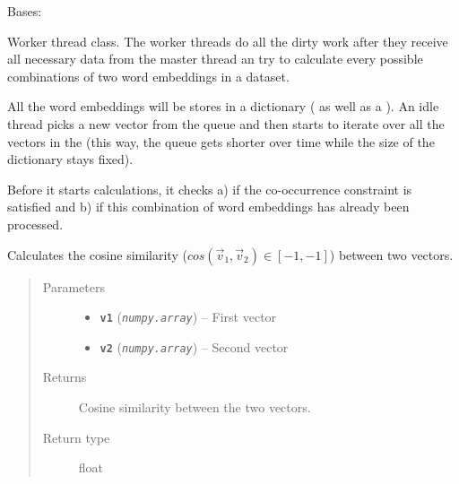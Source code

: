\documentclass[letterpaper,10pt,english]{sphinxmanual}
\begin{document}
\begin{fulllineitems}
\label{src.mapping:src.mapping.mapthreading.MappingWorkerThread}
Bases: 

Worker thread class. The worker threads do all the dirty work after they receive all necessary data from the master
thread an try to calculate every possible combinations of two word embeddings in a dataset.

All the word embeddings will be stores in a dictionary ({\hyperref[src.mapping:src.mapping.mapthreading.VectorDict]{}} as well as a ).
An idle thread picks a new vector from the queue and then starts to iterate over all the vectors in the
{\hyperref[src.mapping:src.mapping.mapthreading.VectorDict]{}} (this way, the queue gets shorter over time while the size of the dictionary stays fixed).

Before it starts calculations, it checks a) if the co-occurrence constraint is satisfied and b) if this combination
of word embeddings has already been processed.

\begin{fulllineitems}
\label{src.mapping:src.mapping.mapthreading.MappingWorkerThread.cosine_similarity}
Calculates the cosine similarity (\(cos(\vec{v}_1, \vec{v}_2) \in [-1,-1]\)) between two vectors.
\begin{quote}\begin{description}
\item[{Parameters}] \leavevmode\begin{itemize}
\item {} 
\textbf{\texttt{v1}} (\emph{\texttt{numpy.array}}) -- First vector

\item {} 
\textbf{\texttt{v2}} (\emph{\texttt{numpy.array}}) -- Second vector

\end{itemize}

\item[{Returns}] \leavevmode
Cosine similarity between the two vectors.

\item[{Return type}] \leavevmode
float


\end{description}
\end{quote}
\end{fulllineitems}
\end{fulllineitems}
\end{document}
